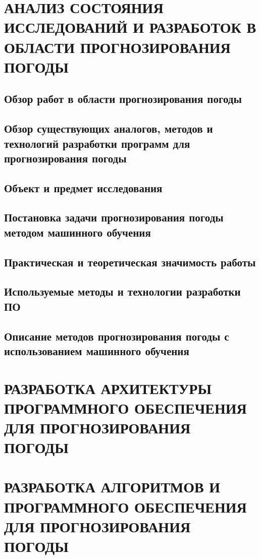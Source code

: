 \documentclass[14pt]{extarticle}
\begin{document}
\section{АНАЛИЗ СОСТОЯНИЯ ИССЛЕДОВАНИЙ И РАЗРАБОТОК В ОБЛАСТИ ПРОГНОЗИРОВАНИЯ ПОГОДЫ}
\lipsum[11]
\subsection{Обзор работ в области прогнозирования погоды}
\subsection{Обзор существующих аналогов, методов и технологий разработки программ для прогнозирования погоды}
\subsection{Объект и предмет исследования}
\subsection{Постановка задачи прогнозирования погоды методом машинного обучения}
\subsection{Практическая и теоретическая значимость работы}
\subsection{Используемые методы и технологии разработки ПО}
\subsection{Описание методов прогнозирования погоды с использованием машинного обучения}

\lipsum[21-30]
\section{РАЗРАБОТКА АРХИТЕКТУРЫ ПРОГРАММНОГО ОБЕСПЕЧЕНИЯ ДЛЯ ПРОГНОЗИРОВАНИЯ ПОГОДЫ}
\lipsum[31-40]
\section{РАЗРАБОТКА АЛГОРИТМОВ И ПРОГРАММНОГО ОБЕСПЕЧЕНИЯ ДЛЯ ПРОГНОЗИРОВАНИЯ ПОГОДЫ}
\lipsum[41-50]
\end{document}
